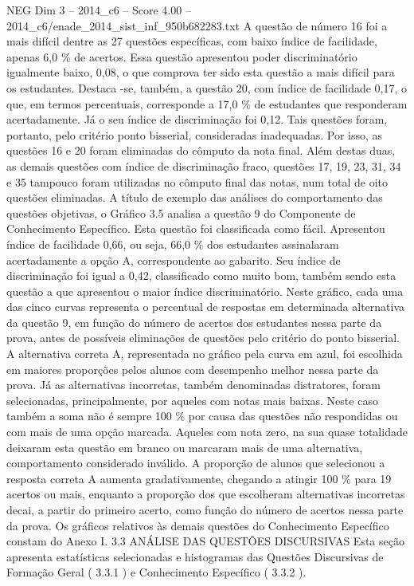 \begin{textsample}{NEG Dim 3 – 2014\_c6 – Score 4.00 – 2014\_c6/enade\_2014\_sist\_inf\_950b682283.txt}
A questão de número 16 foi a mais difícil dentre as 27 questões específicas, com baixo índice de facilidade, apenas 6,0 \% de acertos.
Essa questão apresentou poder discriminatório igualmente baixo, 0,08, o que comprova ter sido esta questão a mais difícil para os estudantes.
Destaca -se, também, a questão 20, com índice de facilidade 0,17, o que, em termos percentuais, corresponde a 17,0 \% de estudantes que responderam acertadamente.
Já o seu índice de discriminação foi 0,12.
Tais questões foram, portanto, pelo critério ponto bisserial, consideradas inadequadas.
Por isso, as questões 16 e 20 foram eliminadas do cômputo da nota final.
Além destas duas, as demais questões com índice de discriminação fraco, questões 17, 19, 23, 31, 34 e 35 tampouco foram utilizadas no cômputo final das notas, num total de oito questões eliminadas.
A título de exemplo das análises do comportamento das questões objetivas, o Gráfico 3.5 analisa a questão 9 do Componente de Conhecimento Específico.
Esta questão foi classificada como fácil.
Apresentou índice de facilidade 0,66, ou seja, 66,0 \% dos estudantes assinalaram acertadamente a opção A, correspondente ao gabarito.
Seu índice de discriminação foi igual a 0,42, classificado como muito bom, também sendo esta questão a que apresentou o maior índice discriminatório.
Neste gráfico, cada uma das cinco curvas representa o percentual de respostas em determinada alternativa da questão 9, em função do número de acertos dos estudantes nessa parte da prova, antes de possíveis eliminações de questões pelo critério do ponto bisserial.
A alternativa correta A, representada no gráfico pela curva em azul, foi escolhida em maiores proporções pelos alunos com desempenho melhor nessa parte da prova.
Já as alternativas incorretas, também denominadas distratores, foram selecionadas, principalmente, por aqueles com notas mais baixas.
Neste caso também a soma não é sempre 100 \% por causa das questões não respondidas ou com mais de uma opção marcada.
Aqueles com nota zero, na sua quase totalidade deixaram esta questão em branco ou marcaram mais de uma alternativa, comportamento considerado inválido.
A proporção de alunos que selecionou a resposta correta A aumenta gradativamente, chegando a atingir 100 \% para 19 acertos ou mais, enquanto a proporção dos que escolheram alternativas incorretas decai, a partir do primeiro acerto, como função do número de acertos nessa parte da prova.
Os gráficos relativos às demais questões do Conhecimento Específico constam do Anexo I. 3.3 ANÁLISE DAS QUESTÕES DISCURSIVAS Esta seção apresenta estatísticas selecionadas e histogramas das Questões Discursivas de Formação Geral ( 3.3.1 ) e Conhecimento Específico ( 3.3.2 ).

\end{textsample}
